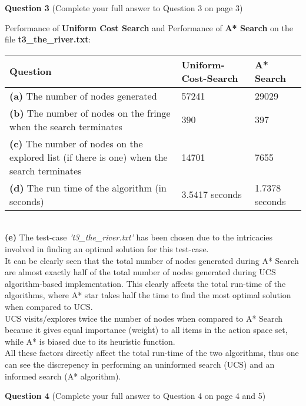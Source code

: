 \documentclass[11pt,a4paper,noindent]{article}
\begin{document}
\newpage\noindent
\textbf{Question 3} (Complete your full answer to Question 3 on page 3)


\begin{center}
Performance of \textbf{Uniform Cost Search} and Performance of \textbf{A* Search} on the file \textbf{t3\_the\_river.txt}:
\newline \\
    \begin{tabular}{ | m{7cm} | m{3cm} | m{3cm} | }
    \hline
    Question & Uniform-Cost-Search & A* Search \\ [0.5ex]
    \hline \hline 
    \textbf{(a)} The number of nodes generated & 57241 & 29029\\
    \hline 
    \textbf{(b)} The number of nodes on the fringe when the search terminates & 390 & 397 \\
    \hline 
    \textbf{(c)} The number of nodes on the explored list (if there is one) when the search terminates & 14701 & 7655 \\
    \hline 
    \textbf{(d)} The run time of the algorithm (in seconds) & 3.5417 seconds & 1.7378 seconds \\
    \hline
    \end{tabular}
\end{center}

\noindent \\ \textbf{(e)} The test-case \emph{'t3\_the\_river.txt'} has been chosen due to the intricacies involved in finding an optimal solution for this test-case. \\
It can be clearly seen that the total number of nodes generated during A* Search are almost exactly half of the total number of nodes generated during UCS algorithm-based implementation. This clearly affects the total run-time of the algorithms, where A* star takes half the time to find the most optimal solution when compared to UCS. \\
UCS visits/explores twice the number of nodes when compared to A* Search because it gives equal importance (weight) to all items in the action space set, while A* is biased due to its heuristic function.\\
All these factors directly affect the total run-time of the two algorithms, thus one can see the discrepency in performing an uninformed search (UCS) and an informed search (A* algorithm).

\newpage\noindent
\textbf{Question 4} (Complete your full answer to Question 4 on page 4 and 5)
\end{document}
